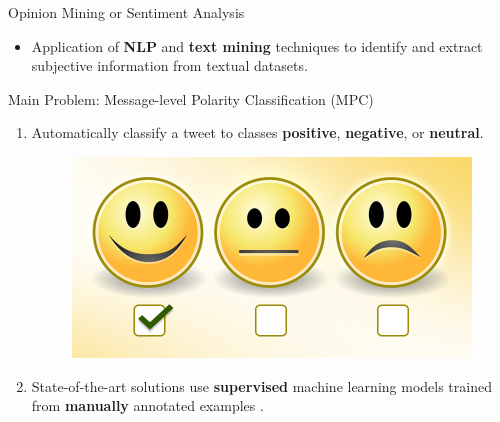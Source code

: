 \documentclass[handout]{beamer}
\begin{document}
\begin{frame}{Opinion Mining or Sentiment Analysis}
\begin{scriptsize}\begin{itemize}
 \item Application of \textbf{NLP} and \textbf{text mining} techniques to identify and extract subjective information from textual datasets.
\end{itemize}

\begin{block}{Main Problem: Message-level Polarity Classification (MPC)}
  \begin{enumerate}
   \item Automatically classify a tweet to classes \textcolor[rgb]{0.00,0.00,1.00}{\textbf{positive}}, \textcolor[rgb]{1.00,0.00,0.00}{\textbf{negative}}, or \textcolor[rgb]{0.00,1.00,0.00}{\textbf{neutral}}. 
   
     \begin{figure}[h]
        	\includegraphics[scale = 0.15]{pics/sent.png}
        \end{figure}
   
   \item State-of-the-art solutions use \textbf{supervised} machine learning models trained from \textbf{manually} annotated examples \cite{NRCJAIR14}.
  \end{enumerate} 
\end{block}

\end{scriptsize}

\end{frame}
\end{document}
